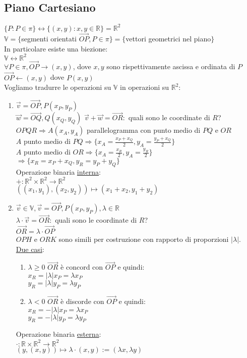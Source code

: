 \documentclass{article}
\newcommand{\ul}[1]{\underline{#1}}
\newcommand{\R}{\mathbb{R}}
\newcommand{\V}{\mathbb{V}}
\begin{document}
\subsection{Piano Cartesiano}
\par$\{P:P\in\pi\}\leftrightarrow\{(x,y):x,y\in\R\}=\R^2$\\
$\V=\{$segmenti orientati $\vec{OP},P\in\pi\}=\{$vettori geometrici nel piano$\}$\\
In particolare esiste una biezione:\\
$\V\leftrightarrow\R^2$\\
$\forall P\in\pi,\vec{OP}\rightarrow(x,y)$, dove $x,y$ sono rispettivamente ascissa e ordinata di $P$\\
$\vec{OP}\leftarrow(x,y)$ dove $P(x,y)$\\
Vogliamo tradurre le operazioni su $\V$ in operazioni su $\R^2$:
\begin{enumerate}
	\item $\vec{v}=\vec{OP},P(x_P,y_P)$\\
	  $\vec{w}=\vec{OQ},Q(x_Q,y_Q)$
	  $\vec{v}+\vec{w}=\vec{OR}:$ quali sono le coordinate di $R$?\\
	  $OPQR\Rightarrow A(x_A,y_A)$ parallelogramma con punto medio di $PQ$ e $OR$\\
	  $A$ punto medio di $PQ\Rightarrow\{x_A=\frac{x_P+x_Q}{2},y_A=\frac{y_P+x_Q}{2}\}$\\
	  $A$ punto medio di $OR\Rightarrow\{x_A=\frac{x_R}{2},y_A=\frac{y_R}{2}\}$\\
	  $\Rightarrow\{x_R=x_P+x_Q,y_R=y_P+y_Q\}$\\
	  Operazione binaria \ul{interna}:\\
	  $+:\R^2\times\R^2\rightarrow\R^2$\\
	  $((x_1,y_1),(x_2,y_2))\mapsto(x_1+x_2,y_1+y_2)$
	\item $\vec{v}\in\V,\vec{v}=\vec{OP},P(x_P,y_P),\lambda\in\R$\\
	  $\lambda\cdot\vec{v}=\vec{OR}:$ quali sono le coordinate di $R$?\\
	  $\vec{OR}=\lambda\cdot\vec{OP}$\\
	  $OPH$ e $ORK$ sono simili per costruzione con rapporto di proporzioni $|\lambda|$.\\
	  \ul{Due casi}:
	  \begin{enumerate}
		  \item $\lambda\ge0$ $\vec{OR}$ è concord con $\vec{OP}$ e quindi:\\
		    $x_R=|\lambda|x_P=\lambda x_P$\\
		    $y_R=|\lambda|y_P=\lambda y_P$
		  \item $\lambda<0$ $\vec{OR}$ è discorde con $\vec{OP}$ e quindi:\\
		    $x_R=-|\lambda|x_P=\lambda x_P$\\
		    $y_R=-|\lambda|y_P=\lambda y_P$
	  \end{enumerate}
	  Operazione binaria \ul{esterna}:\\
	  $\cdot:\R\times\R^2\rightarrow\R^2$\\
	  \hspace*{0.1em}$(y,(x,y))\mapsto\lambda\cdot(x,y):=(\lambda x,\lambda y)$
\end{enumerate}
\end{document}
